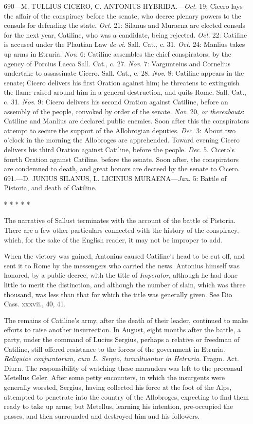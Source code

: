 690—M. TULLIUS CICERO, C. ANTONIUS HYBRIDA.—\emph{Oct}. 19: Cicero lays
the affair of the conspiracy before the senate, who decree plenary
powers to the consuls for defending the state. \emph{Oct}. 21: Silanus and
Muraena are elected consuls for the next year, Catiline, who was a
candidate, being rejected. \emph{Oct}. 22: Catiline is accused under the
Plautian Law \emph{de vi}. Sall. Cat., c. 31. \emph{Oct}. 24: Manlius takes up
arms in Etruria. \emph{Nov}. 6: Catiline assembles the chief conspirators,
by the agency of Porcius Laeca Sall. Cat., c. 27. \emph{Nov}. 7: Vargunteius
and Cornelius undertake to assassinate Cicero. Sall. Cat., c. 28.
\emph{Nov}. 8: Catiline appears in the senate; Cicero delivers his first
Oration against him; he threatens to extinguish the flame raised
around him in a general destruction, and quits Rome. Sall. Cat., c.
31. \emph{Nov}. 9: Cicero delivers his second Oration against Catiline,
before an assembly of the people, convoked by order of the senate.
\emph{Nov}. 20, \emph{or thereabouts}: Catiline and Manlius are declared public
enemies. Soon after this the conspirators attempt to secure the
support of the Allobrogian deputies. \emph{Dec}. 3: About two o'clock in
the morning the Allobroges are apprehended. Toward evening Cicero
delivers his third Oration against Catiline, before the people. \emph{Dec}.
5. Cicero's fourth Oration against Catiline, before the senate. Soon
after, the conspirators are condemned to death, and great honors are
decreed by the senate to Cicero. 691.—D. JUNIUS SILANUS, L. LICINIUS
MURAENA—\emph{Jan}. 5: Battle of Pistoria, and death of Catiline.

* * * * *

The narrative of Sallust terminates with the account of the battle of
Pistoria. There are a few other particulars connected with the history
of the conspiracy, which, for the sake of the English reader, it may
not be improper to add.

When the victory was gained, Antonius caused Catiline's head to be cut
off, and sent it to Rome by the messengers who carried the news.
Antonius himself was honored, by a public decree, with the title of
\emph{Imperator}, although he had done little to merit the distinction, and
although the number of slain, which was three thousand, was less than
that for which the title was generally given. See Dio Cass. xxxvii.,
40, 41.

The remains of Catiline's army, after the death of their leader,
continued to make efforts to raise another insurrection. In August,
eight months after the battle, a party, under the command of Lucius
Sergius, perhaps a relative or freedman of Catiline, still offered
resistance to the forces of the government in Etruria. \emph{Reliquiae
conjuratorum, cum L. Sergio, tumultuantur in Hetruria}. Fragm. Act.
Diurn. The responsibility of watching these marauders was left to the
proconsul Metellus Celer. After some petty encounters, in which the
insurgents were generally worsted, Sergius, having collected his force
at the foot of the Alps, attempted to penetrate into the country of
the Allobroges, expecting to find them ready to take up arms; but
Metellus, learning his intention, pre-occupied the passes, and then
surrounded and destroyed him and his followers.

